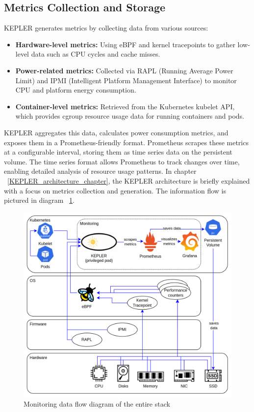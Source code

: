 \subsection{Metrics Collection and Storage}

KEPLER generates metrics by collecting data from various sources:
\begin{itemize}
\item \textbf{Hardware-level metrics:} Using eBPF and kernel tracepoints to gather low-level data such as CPU cycles and cache misses.
\item \textbf{Power-related metrics:} Collected via RAPL (Running Average Power Limit) and IPMI (Intelligent Platform Management Interface) to monitor CPU and platform energy consumption.
\item \textbf{Container-level metrics:} Retrieved from the Kubernetes kubelet API, which provides cgroup resource usage data for running containers and pods.
\end{itemize}

KEPLER aggregates this data, calculates power consumption metrics, and exposes them in a Prometheus-friendly format. Prometheus scrapes these metrics at a configurable interval, storing them as time series data on the persistent volume. The time series format allows Prometheus to track changes over time, enabling detailed analysis of resource usage patterns. In chapter ~\ref{KEPLER_architecture_chapter}, the KEPLER architecture is briefly explained with a focus on metrics collection and generation. The information flow is pictured in diagram ~\ref{fig:stack_data_flow}.

\begin{figure}[ht]
    \centering
    \includegraphics[width=1\textwidth]{Figures/data_flow_diagram.png}
    \decoRule
    \caption[Monitoring data flow diagram of the entire stack]{Monitoring data flow diagram of the entire stack}
    \label{fig:stack_data_flow}
\end{figure}

